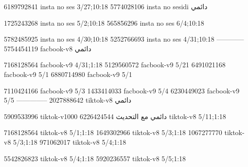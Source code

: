 
6189792841 insta no ses
3/27;10:18
5774028106 insta no sesidi
دائمي


1725243268 insta no ses
5/2;10:18
565856296 insta no ses
6/4;10:18

5782485925 insta no ses
4/30;10:18
5252766693 insta no ses
4/31;10:18
------------
5754454119 facbook-v8
دائمي

7168128564 facbook-v9
4/31;1:18
5129560572 facbook-v9
5/21
6491021168 facbook-v9
5/1
6880714980 facbook-v9
5/1

7110424166 facbook-v9
5/3
1433414033 facbook-v9
5/4
6230449023 facbook-v9
5/5
--------------
2027888642 tiktok-v8
دائمي

5909533996 tiktok-v1000
دائمي مع التحديث
6226424544 tiktok-v8
5/11;1:18

7168128564 tiktok-v8
5/1;1:18
1649302966 tiktok-v8
5/3;1:18
1067277770 tiktok-v8
5/3;1:18
971062017 tiktok-v8
5/4;1:18

5542826823 tiktok-v8
5/4;1:18
5920236557 tiktok-v8
5/5;1:18
